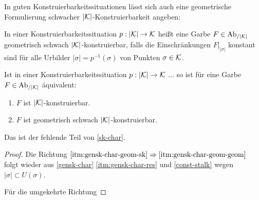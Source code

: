 In guten Konstruierbarkeitssituationen lässt sich auch eine
geometrische Formulierung schwacher $|\mathcal{K}|$-Konstruierbarkeit angeben:
\begin{defn}
  In einer Konstruierbarkeitssituation $p: |\mathcal{K}| \to \mathcal{K}$ heißt eine
  Garbe $F \in \operatorname{Ab}_{/|\mathcal{K}|}$ geometrisch schwach $|\mathcal{K}|$-konstruierbar, falls
  die Einschränkungen $F|_{|\sigma|}$ konstant sind für alle Urbilder
  $|\sigma| = p^{-1}(\sigma)$ von Punkten $\sigma \in \mathcal{K}$.
\end{defn}
\begin{prop} \label{gensk-char-geom}
  Ist in einer Konstruierbarkeitssituation $p: |\mathcal{K}| \to \mathcal{K}$ ...  so
  ist für eine Garbe $F \in \operatorname{Ab}_{/|\mathcal{K}|}$ äquivalent:
  \begin{enumerate}
    \item \label{itm:gensk-char-geom-sk} $F$ ist $|\mathcal{K}|$-konstruierbar.
    \item \label{itm:gensk-char-geom-geom} $F$ ist geometrisch schwach
      $|\mathcal{K}|$-konstruierbar.
  \end{enumerate}
  \end{prop}
Das ist der fehlende Teil von \ref{sk-char}.
\begin{proof}
  Die Richtung $\ref{itm:gensk-char-geom-sk} \Rightarrow
  \ref{itm:gensk-char-geom-geom}$ folgt wieder aus \ref{gensk-char}
  \ref{itm:gensk-char-res} und \ref{const-stalk} wegen $|\sigma|
  \subset U(\sigma)$.

  Für die umgekehrte Richtung %
\end{proof}



